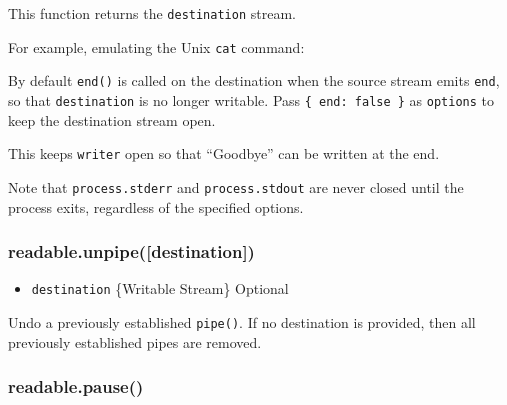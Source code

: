 This function returns the \texttt{destination} stream.

For example, emulating the Unix \texttt{cat} command:

\begin{Shaded}
\begin{Highlighting}[]
\NormalTok{(}\NormalTok{);}
\end{Highlighting}
\end{Shaded}

By default \texttt{end()} is called on the destination when the source
stream emits \texttt{end}, so that \texttt{destination} is no longer
writable. Pass \texttt{\{ end: false \}} as \texttt{options} to keep the
destination stream open.

This keeps \texttt{writer} open so that ``Goodbye'' can be written at
the end.

\begin{Shaded}
\begin{Highlighting}[]
\NormalTok{: } \NormalTok{\});}
\NormalTok{(}\NormalTok{, }\NormalTok{() \{}
  \NormalTok{(}\NormalTok{);}
\NormalTok{\});}
\end{Highlighting}
\end{Shaded}

Note that \texttt{process.stderr} and \texttt{process.stdout} are never
closed until the process exits, regardless of the specified options.

\subsubsection{readable.unpipe({[}destination{]})}

\begin{itemize}
\item
  \texttt{destination} \{Writable Stream\} Optional
\end{itemize}

Undo a previously established \texttt{pipe()}. If no destination is
provided, then all previously established pipes are removed.

\subsubsection{readable.pause()}

